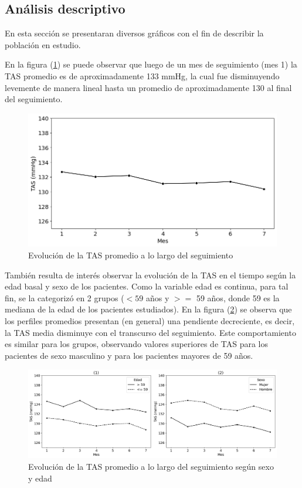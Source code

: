 \documentclass[spanish]{article}
\numberwithin{figure}{subsection}
\numberwithin{equation}{subsection}
\numberwithin{table}{subsection}
\begin{document}
\subsection{Análisis descriptivo}

En esta sección se presentaran diversos gráficos con el fin de describir la
población en estudio.

En la figura (\ref{TAS_vs_tpo}) se puede observar que luego de un mes de
seguimiento (mes 1) la TAS promedio es de aproximadamente 133 mmHg, la cual fue
disminuyendo levemente de manera lineal hasta un promedio de aproximadamente 130
al final del seguimiento.

\begin{figure}[H]
	\centering
	\includegraphics[scale=0.5]{img/TAS_vs_tpo.png}
	\caption{Evolución de la TAS promedio a lo largo del seguimiento}
	\label{TAS_vs_tpo}
\end{figure}

También resulta de interés observar la evolución de la TAS en el tiempo según la
edad basal y sexo de los pacientes. Como la variable edad es continua, para tal
fin, se la categorizó en 2 grupos ($< 59$ años y $>=$ 59 años, donde 59 es la
mediana de la edad de los pacientes estudiados). En la figura
(\ref{TAS_with_covs}) se observa que los perfiles promedios presentan (en
general) una pendiente decreciente, es decir, la TAS media disminuye con el
transcurso del seguimiento. Este comportamiento es similar para los grupos,
observando valores superiores de TAS para los pacientes de sexo masculino y para
los pacientes mayores de 59 años.

\begin{figure}[H]
	\centering
	\includegraphics[scale=0.4]{img/TAS_vs_tpo_with_covs.png}
	\caption{Evolución de la TAS promedio a lo largo del seguimiento según sexo y edad}
	\label{TAS_with_covs}
\end{figure}
\end{document}
